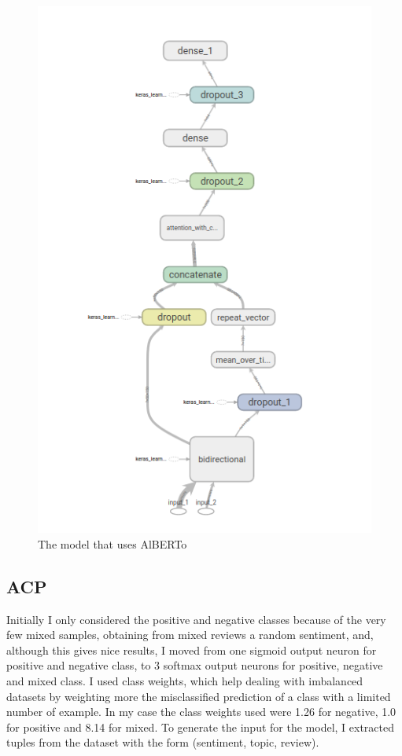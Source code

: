 \documentclass{article}
\begin{document}
            \begin{figure}
            \includegraphics[width=\linewidth]{alberto_model.png}
            \caption{The model that uses AlBERTo}
            \label{fig:alberto_model}
        \end{figure}

        \subsection{ACP}\label{subsec:s1}
            Initially I only considered the positive and negative classes because of the very few mixed samples, obtaining from
            mixed reviews a random sentiment, and, although this gives nice results, I moved from one sigmoid output neuron for
            positive and negative class, to 3 softmax output neurons for positive, negative and mixed class.
            I used class weights, which help dealing with imbalanced datasets by weighting more the misclassified prediction of a class
            with a limited number of example.
            In my case the class weights used were 1.26 for negative, 1.0 for positive and 8.14 for mixed.
            To generate the input for the model, I extracted tuples from the dataset with the form (sentiment, topic, review).
\end{document}
